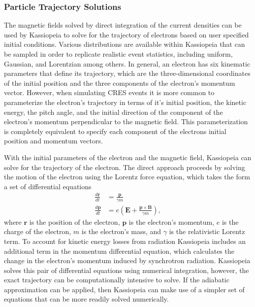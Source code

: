 \subsubsection*{Particle Trajectory Solutions}

The magnetic fields solved by direct integration of the current densities can be used by Kassiopeia to solve for the trajectory of electrons based on user specified initial conditions. Various distributions are available within Kassiopeia that can be sampled in order to replicate realistic event statistics, including uniform, Gaussian, and Lorentzian among others. In general, an electron has six kinematic parameters that define its trajectory, which are the three-dimensional coordinates of the initial position and the three components of the electron's momentum vector. However, when simulating CRES events it is more common to parameterize the electron's trajectory in terms of it's initial position, the kinetic energy, the pitch angle, and the initial direction of the component of the electron's momentum perpendicular to the magnetic field. This parameterization is completely equivalent to specify each component of the electrons initial position and momentum vectors. 

With the initial parameters of the electron and the magnetic field, Kassiopeia can solve for the trajectory of the electron. The direct approach proceeds by solving the motion of the electron using the Lorentz force equation, which takes the form a set of differential equations 
\begin{align}
    \frac{d\mathbf{r}}{dt}&=\frac{\mathbf{p}}{\gamma m}\\
    \frac{d\mathbf{p}}{dt}&=e(\mathbf{E}+\frac{\mathbf{p}\times\mathbf{B}}{\gamma m}),
\end{align}
where $\mathbf{r}$ is the position of the electron, $\mathbf{p}$ is the electron's momentum, $e$ is the charge of the electron, $m$ is the electron's mass, and $\gamma$ is the relativistic Lorentz term. To account for kinetic energy losses from radiation Kassiopeia includes an additional term in the momentum differential equation, which calculates the change in the electron's momentum induced by synchrotron radiation. Kassiopeia solves this pair of differential equations using numerical integration, however, the exact trajectory can be computationally intensive to solve. If the adiabatic approximation can be applied, then Kassiopeia can make use of a simpler set of equations that can be more readily solved numerically. 

